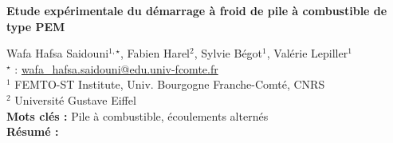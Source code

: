 


    \newpage

\BgThispage

%
\begin{flushleft}
\addtocounter{section}{1}
{\Large \textbf{Etude expérimentale du démarrage à froid de pile à combustible de type PEM}}\label{ref:88}
\end{flushleft}
%
Wafa Hafsa Saidouni$^{1,\star}$, Fabien Harel$^{2}$, Sylvie Bégot$^{1}$, Valérie Lepiller$^{1}$\\[2mm]
$^{\star}$ \Letter : \url{wafa_hafsa.saidouni@edu.univ-fcomte.fr}\\[2mm]
{\footnotesize $^{1}$ FEMTO-ST Institute, Univ. Bourgogne Franche-Comté, CNRS}\\
{\footnotesize $^{2}$ Université Gustave Eiffel}\\
[4mm]
%
\noindent \textbf{Mots clés : } Pile à combustible, écoulements alternés\\[4mm]
%
\noindent \textbf{Résumé : } 

